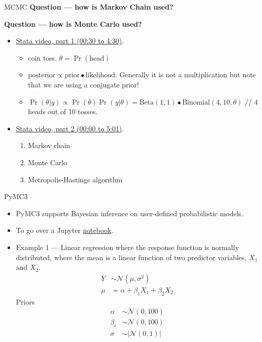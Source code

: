 \documentclass[20pt]{beamer}
\begin{document}
\begin{frame}{MCMC}
\textbf{Question --- how is Markov Chain used?}

\textbf{Question --- how is Monte Carlo used?}

\begin{itemize}
\item \href{https://www.youtube.com/watch?v=0F0QoMCSKJ4}{Stata video, part 1 (00:30 to 4:30)}.
  \begin{itemize}
    \item coin toss. $\theta = \Pr(\text{head})$
    \item $\text{posterior} \propto \text{prior} \bullet \text{likelihood}$. Generally it is not a multiplication but note that we are using a conjugate prior!
    \item $\Pr(\theta | y) \propto \Pr(\theta) \Pr(y | \theta)
= \text{Beta}(1, 1) \bullet \text{Binomial}(4, 10, \theta)$ // 4 heads out of 10 tosses.
  \end{itemize}

\item \href{https://www.youtube.com/watch?v=OTO1DygELpY}{Stata video, part 2 (00:00 to 5:01)}.
  \begin{enumerate}
    \item Markov chain
    \item Monte Carlo
    \item Metropolis-Hastings algorithm
  \end{enumerate}
\end{itemize}

\end{frame}


\begin{frame}{PyMC3}
\begin{itemize}

\item PyMC3 supports Bayesian inference on user-defined probabilistic models.

\item To go over a Jupyter \href{https://github.com/pymc-devs/pymc-examples/blob/main/examples/getting_started.ipynb}{notebook}.

\item Example 1 --- Linear regression where the response function is normally distributed, where the mean is a linear function of two predictor variables, $X_1$ and $X_2$.
\begin{align*}
  Y  &\sim \mathcal{N}(\mu, \sigma^2) \\
  \mu &= \alpha + \beta_1 X_1 + \beta_2 X_2
\end{align*}
Priors
\begin{align*}
  \alpha &\sim \mathcal{N}(0, 100) \\
  \beta_i &\sim \mathcal{N}(0, 100) \\
  \sigma &\sim \lvert\mathcal{N}(0, 1){\rvert}
\end{align*}

\end{itemize}
\end{frame}
\end{document}
